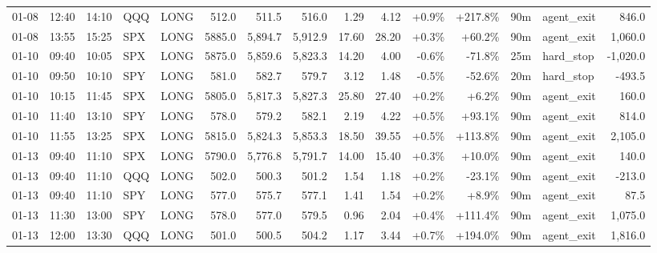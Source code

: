\documentclass[11pt,a4paper,twoside]{article}
\begin{document}
\begin{landscape}
\begin{center}
\begin{longtable}{>{\color{txtmain}}l l l l l r r r r r r r r >{\color{txtmain}}l r}
01-08 & 12:40 & 14:10 & QQQ & LONG & 512.0 & 511.5 & 516.0 & 1.29 & 4.12 & \textcolor{wingreen}{+0.9\%} & \textcolor{wingreen}{+217.8\%} & 90m & agent\_exit & \textcolor{wingreen}{846.0} \\
01-08 & 13:55 & 15:25 & SPX & LONG & 5885.0 & 5,894.7 & 5,912.9 & 17.60 & 28.20 & \textcolor{wingreen}{+0.3\%} & \textcolor{wingreen}{+60.2\%} & 90m & agent\_exit & \textcolor{wingreen}{1,060.0} \\
01-10 & 09:40 & 10:05 & SPX & LONG & 5875.0 & 5,859.6 & 5,823.3 & 14.20 & 4.00 & \textcolor{lossred}{-0.6\%} & \textcolor{lossred}{-71.8\%} & 25m & hard\_stop & \textcolor{lossred}{-1,020.0} \\
01-10 & 09:50 & 10:10 & SPY & LONG & 581.0 & 582.7 & 579.7 & 3.12 & 1.48 & \textcolor{lossred}{-0.5\%} & \textcolor{lossred}{-52.6\%} & 20m & hard\_stop & \textcolor{lossred}{-493.5} \\
01-10 & 10:15 & 11:45 & SPX & LONG & 5805.0 & 5,817.3 & 5,827.3 & 25.80 & 27.40 & \textcolor{wingreen}{+0.2\%} & \textcolor{wingreen}{+6.2\%} & 90m & agent\_exit & \textcolor{wingreen}{160.0} \\
01-10 & 11:40 & 13:10 & SPY & LONG & 578.0 & 579.2 & 582.1 & 2.19 & 4.22 & \textcolor{wingreen}{+0.5\%} & \textcolor{wingreen}{+93.1\%} & 90m & agent\_exit & \textcolor{wingreen}{814.0} \\
01-10 & 11:55 & 13:25 & SPX & LONG & 5815.0 & 5,824.3 & 5,853.3 & 18.50 & 39.55 & \textcolor{wingreen}{+0.5\%} & \textcolor{wingreen}{+113.8\%} & 90m & agent\_exit & \textcolor{wingreen}{2,105.0} \\
01-13 & 09:40 & 11:10 & SPX & LONG & 5790.0 & 5,776.8 & 5,791.7 & 14.00 & 15.40 & \textcolor{wingreen}{+0.3\%} & \textcolor{wingreen}{+10.0\%} & 90m & agent\_exit & \textcolor{wingreen}{140.0} \\
01-13 & 09:40 & 11:10 & QQQ & LONG & 502.0 & 500.3 & 501.2 & 1.54 & 1.18 & \textcolor{wingreen}{+0.2\%} & \textcolor{lossred}{-23.1\%} & 90m & agent\_exit & \textcolor{lossred}{-213.0} \\
01-13 & 09:40 & 11:10 & SPY & LONG & 577.0 & 575.7 & 577.1 & 1.41 & 1.54 & \textcolor{wingreen}{+0.2\%} & \textcolor{wingreen}{+8.9\%} & 90m & agent\_exit & \textcolor{wingreen}{87.5} \\
01-13 & 11:30 & 13:00 & SPY & LONG & 578.0 & 577.0 & 579.5 & 0.96 & 2.04 & \textcolor{wingreen}{+0.4\%} & \textcolor{wingreen}{+111.4\%} & 90m & agent\_exit & \textcolor{wingreen}{1,075.0} \\
01-13 & 12:00 & 13:30 & QQQ & LONG & 501.0 & 500.5 & 504.2 & 1.17 & 3.44 & \textcolor{wingreen}{+0.7\%} & \textcolor{wingreen}{+194.0\%} & 90m & agent\_exit & \textcolor{wingreen}{1,816.0} \\

\end{longtable}
\end{center}
\end{landscape}
\end{document}
